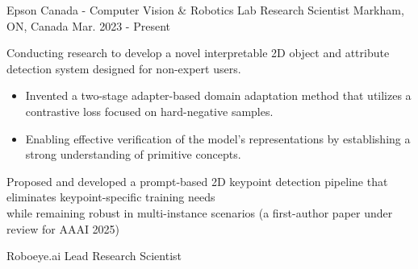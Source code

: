 

\vspace*{0.05cm}
\begin{cventries}

\cventry
{Epson Canada - Computer Vision \& Robotics Lab} %
{Research Scientist} %
{Markham, ON, Canada} %
{Mar. 2023 - Present} %
{ %
\begin{cvitems}
\item {Conducting research to develop a novel interpretable 2D object and attribute detection system designed for non-expert users.}
\begin{itemize}[label=$\cdot$,leftmargin=0.7em]
\item{Invented a two-stage adapter-based domain adaptation method that utilizes a contrastive loss focused on hard-negative samples.}
\item{Enabling effective verification of the model’s representations by establishing a strong understanding of primitive concepts.}
\end{itemize}
\item {Proposed and developed a prompt-based 2D keypoint detection pipeline that eliminates keypoint-specific training needs \\while remaining robust in multi-instance scenarios (a first-author paper under review for AAAI 2025)}
\end{cvitems}
}
\cventry
{Roboeye.ai} %
{Lead Research Scientist} %

\end{cventries}
